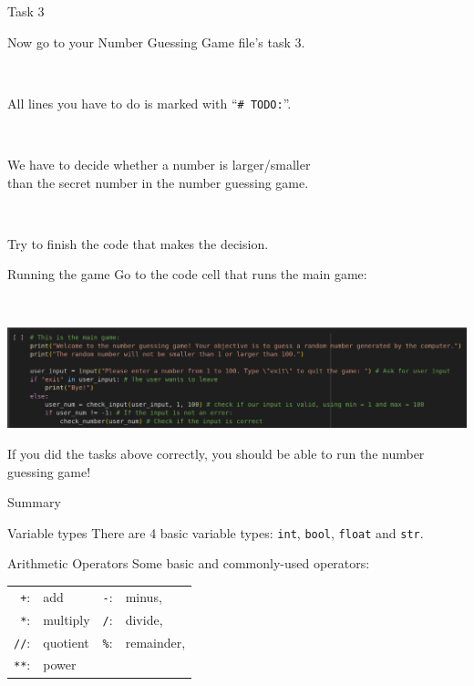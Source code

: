 \documentclass[dvipsnames, svgnames, x11names]{beamer}
\begin{document}
\begin{frame}[fragile]{Task 3}
    \begin{center}
        Now go to your Number Guessing Game file's task 3.

        \
            
        All lines you have to do is marked with ``\texttt{\# TODO:}''.

        \

        We have to decide whether a number is larger/smaller\\
        than the secret number in the number guessing game.

        \

        Try to finish the code that makes the decision.
    \end{center}
\end{frame}

\begin{frame}[fragile]{Running the game}
    Go to the code cell that runs the main game:

    \

    \includegraphics[width=\textwidth]{NumGuessMain.png}

    If you did the tasks above correctly, you should be able to run the number guessing game!
\end{frame}

\begin{frame}[fragile]{Summary}
\begin{block}{Variable types}
There are 4 basic variable types: \texttt{int}, \texttt{bool}, \texttt{float} and \texttt{str}.
\end{block}
\begin{block}{Arithmetic Operators}
Some basic and commonly-used operators:\\
\centering
\begin{tabular}{rlrl}
\texttt{+}:& add & \texttt{-}:& minus,\\
\texttt{*}:& multiply & \texttt{/}:& divide,\\
\texttt{//}:& quotient & \texttt{\%}:& remainder,\\
\texttt{**}:& power &&
\end{tabular}
\end{block}
\end{frame}
\end{document}
